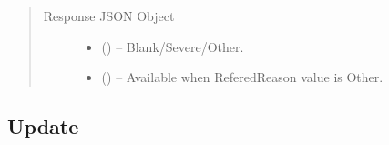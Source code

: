 \documentclass[letterpaper,10pt,english,openany,oneside]{sphinxmanual}
\begin{document}
\begin{fulllineitems}
\begin{sphinxVerbatim}[commandchars=\\\{\}]
         
         
         
         
         
         
  \PYG{p}{]}
\end{sphinxVerbatim}
\begin{quote}\begin{description}
\item[{Response JSON Object}] \leavevmode\begin{itemize}
\item {} 
\sphinxAtStartPar
{} () – Blank/Severe/Other.

\item {} 
\sphinxAtStartPar
{} () – Available when ReferedReason value is Other.

\end{itemize}

\end{description}\end{quote}

\end{fulllineitems}



\subsection{Update}
\label{\detokenize{api/v4:update}}
\end{document}
